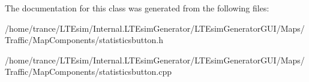 The documentation for this class was generated from the following files\+:\begin{DoxyCompactItemize}
\item 
/home/trance/\+L\+T\+Esim/\+Internal.\+L\+T\+Esim\+Generator/\+L\+T\+Esim\+Generator\+G\+U\+I/\+Maps/\+Traffic/\+Map\+Components/statisticsbutton.\+h\item 
/home/trance/\+L\+T\+Esim/\+Internal.\+L\+T\+Esim\+Generator/\+L\+T\+Esim\+Generator\+G\+U\+I/\+Maps/\+Traffic/\+Map\+Components/statisticsbutton.\+cpp\end{DoxyCompactItemize}
